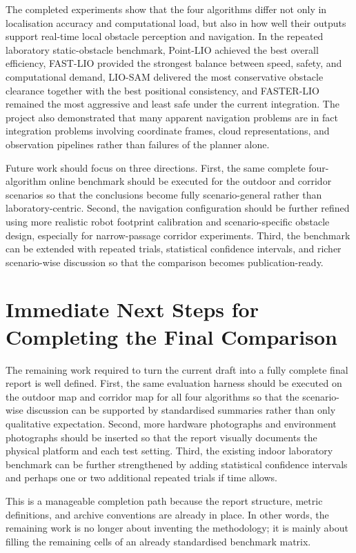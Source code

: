 \documentclass[12pt,a4paper]{report}
\begin{document}
The completed experiments show that the four algorithms differ not only in localisation accuracy and computational load, but also in how well their outputs support real-time local obstacle perception and navigation. In the repeated laboratory static-obstacle benchmark, Point-LIO achieved the best overall efficiency, FAST-LIO provided the strongest balance between speed, safety, and computational demand, LIO-SAM delivered the most conservative obstacle clearance together with the best positional consistency, and FASTER-LIO remained the most aggressive and least safe under the current integration. The project also demonstrated that many apparent navigation problems are in fact integration problems involving coordinate frames, cloud representations, and observation pipelines rather than failures of the planner alone.

Future work should focus on three directions. First, the same complete four-algorithm online benchmark should be executed for the outdoor and corridor scenarios so that the conclusions become fully scenario-general rather than laboratory-centric. Second, the navigation configuration should be further refined using more realistic robot footprint calibration and scenario-specific obstacle design, especially for narrow-passage corridor experiments. Third, the benchmark can be extended with repeated trials, statistical confidence intervals, and richer scenario-wise discussion so that the comparison becomes publication-ready.

\section{Immediate Next Steps for Completing the Final Comparison}
The remaining work required to turn the current draft into a fully complete final report is well defined. First, the same evaluation harness should be executed on the outdoor map and corridor map for all four algorithms so that the scenario-wise discussion can be supported by standardised summaries rather than only qualitative expectation. Second, more hardware photographs and environment photographs should be inserted so that the report visually documents the physical platform and each test setting. Third, the existing indoor laboratory benchmark can be further strengthened by adding statistical confidence intervals and perhaps one or two additional repeated trials if time allows.

This is a manageable completion path because the report structure, metric definitions, and archive conventions are already in place. In other words, the remaining work is no longer about inventing the methodology; it is mainly about filling the remaining cells of an already standardised benchmark matrix.
\end{document}
